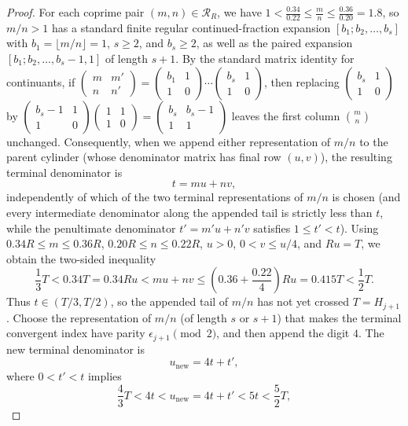 \documentclass[11pt]{article}
\theoremstyle{definition}
\theoremstyle{remark}
\begin{document}
\begin{proof}
For each coprime pair $(m,n)\in\mathcal R_R$, we have
$1<\frac{0.34}{0.22}\le\frac{m}{n}\le\frac{0.36}{0.20}=1.8$, so $m/n>1$ has a
standard finite regular continued-fraction expansion $[b_1;b_2,\dots,b_s]$ with
$b_1=\lfloor m/n\rfloor=1$, $s\ge2$, and $b_s\ge2$, as well as the paired
expansion $[b_1;b_2,\dots,b_s-1,1]$ of length $s+1$. By the standard matrix
identity for continuants, if $\begin{pmatrix}m & m'\\ n & n'\end{pmatrix}
=\begin{pmatrix}b_1 & 1\\ 1 & 0\end{pmatrix}\cdots\begin{pmatrix}b_s & 1\\ 1 & 0\end{pmatrix}$,
then replacing $\begin{pmatrix}b_s & 1\\ 1 & 0\end{pmatrix}$ by
$\begin{pmatrix}b_s-1 & 1\\ 1 & 0\end{pmatrix}\begin{pmatrix}1 & 1\\ 1 & 0\end{pmatrix}
=\begin{pmatrix}b_s & b_s-1\\ 1 & 1\end{pmatrix}$ leaves the first column
$\binom{m}{n}$ unchanged. Consequently, when we append either representation of
$m/n$ to the parent cylinder (whose denominator matrix has final row $(u,v)$),
the resulting terminal denominator is
\[
t=mu+nv,
\]
independently of which of the two terminal representations of $m/n$ is chosen
(and every intermediate denominator along the appended tail is strictly less
than $t$, while the penultimate denominator $t'=m'u+n'v$ satisfies $1\le t'<t$).
Using $0.34R\le m\le0.36R$, $0.20R\le n\le0.22R$, $u>0$, $0<v\le u/4$, and
$Ru=T$, we obtain the two-sided inequality
\[
\frac13 T<0.34T=0.34Ru<mu+nv\le\left(0.36+\frac{0.22}{4}\right)Ru=0.415T<\frac12 T.
\]
Thus $t\in(T/3,T/2)$, so the appended tail of $m/n$ has not yet crossed
$T=H_{j+1}$. Choose the representation of $m/n$ (of length $s$ or $s+1$) that
makes the terminal convergent index have parity $\epsilon_{j+1}\pmod2$, and
then append the digit $4$. The new terminal denominator is
\[
u_{\mathrm{new}}=4t+t',
\]
where $0<t'<t$ implies
\[
\frac43 T<4t<u_{\mathrm{new}}=4t+t'<5t<\frac52 T,
\]
\end{proof}
\end{document}
